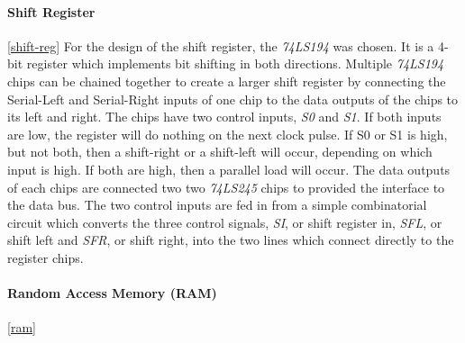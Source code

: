 \paragraph{Shift Register} \ref{shift-reg}
For the design of the shift register, the \emph{74LS194} \cite{74ls194} was chosen. It is a 4-bit register which implements
bit shifting in both directions. Multiple \emph{74LS194} chips can be chained together to create a larger shift register by
connecting the Serial-Left and Serial-Right inputs of one chip to the data outputs of the chips to its left and right.
The chips have two control inputs, \emph{S0} and \emph{S1}. If both inputs are low, the register will do nothing on the next clock
pulse. If S0 or S1 is high, but not both, then a shift-right or a shift-left will occur, depending on which input is high.
If both are high, then a parallel load will occur. The data outputs of each chips are connected two two \emph{74LS245}
\cite{74ls245} chips to provided the interface to the data bus. The two control inputs are fed in from a simple combinatorial
circuit which converts the three control signals, \emph{SI}, or shift register in, \emph{SFL}, or shift left and \emph{SFR}, or
shift right, into the two lines which connect directly to the register chips.



\paragraph{Random Access Memory (RAM)} \ref{ram}
